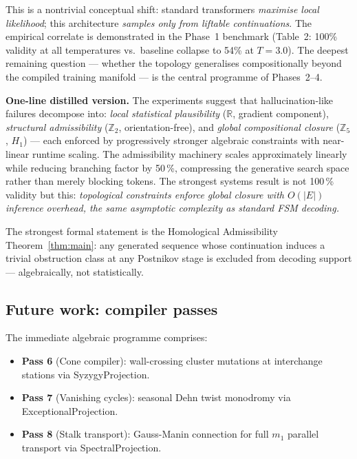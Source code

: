 \documentclass[11pt,a4paper]{article}
\begin{document}
\noindent
This is a nontrivial conceptual shift:
standard transformers \emph{maximise local likelihood};
this architecture \emph{samples only from liftable continuations}.
The empirical correlate is demonstrated in the Phase~1 benchmark
(Table~2: 100\% validity at all temperatures vs.\ baseline collapse
to 54\% at $T=3.0$).
The deepest remaining question --- whether the topology generalises
compositionally beyond the compiled training manifold --- is
the central programme of Phases~2--4.

\medskip\noindent
\textbf{One-line distilled version.}
The experiments suggest that hallucination-like failures decompose into:
\emph{local statistical plausibility} ($\mathbb{R}$, gradient component),
\emph{structural admissibility} ($\mathbb{Z}_2$, orientation-free),
and \emph{global compositional closure} ($\mathbb{Z}_5$, $H_1$) ---
each enforced by progressively stronger algebraic constraints with
near-linear runtime scaling.
The admissibility machinery scales approximately linearly while
reducing branching factor by 50\,\%, compressing the generative
search space rather than merely blocking tokens.
The strongest systems result is not 100\,\% validity but this:
\emph{topological constraints enforce global closure with
$O(|E|)$ inference overhead, the same asymptotic complexity as
standard FSM decoding.}

The strongest formal statement is the Homological Admissibility
Theorem~\ref{thm:main}: any generated sequence whose continuation
induces a trivial obstruction class at any Postnikov stage is
excluded from decoding support --- algebraically, not
statistically.

\subsection*{Future work: compiler passes}

The immediate algebraic programme comprises:
\begin{itemize}
  \item \textbf{Pass 6} (Cone compiler): wall-crossing cluster
        mutations at interchange stations via SyzygyProjection.
  \item \textbf{Pass 7} (Vanishing cycles): seasonal Dehn twist
        monodromy via ExceptionalProjection.
  \item \textbf{Pass 8} (Stalk transport): Gauss-Manin connection
        for full $m_1$ parallel transport via SpectralProjection.
\end{itemize}
\end{document}
